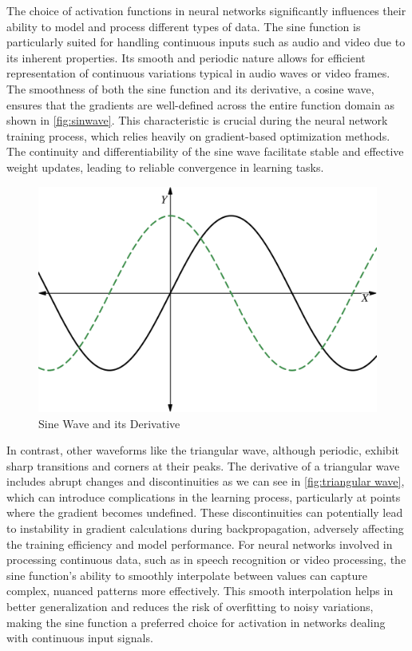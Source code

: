     The choice of activation functions in neural networks significantly influences their ability to model and process different types of data. The sine function is particularly suited for handling continuous inputs such as audio and video due to its inherent properties. Its smooth and periodic nature allows for efficient representation of continuous variations typical in audio waves or video frames. The smoothness of both the sine function and its derivative, a cosine wave, ensures that the gradients are well-defined across the entire function domain as shown in \autoref{fig:sinwave}. This characteristic is crucial during the neural network training process, which relies heavily on gradient-based optimization methods. The continuity and differentiability of the sine wave facilitate stable and effective weight updates, leading to reliable convergence in learning tasks.

    \begin{figure}[H]
        \centering
        \includegraphics[height=0.25\textheight]{assets/sine-wave.png}
        \caption{Sine Wave and its Derivative}
        \label{fig:sinwave}
    \end{figure}

    In contrast, other waveforms like the triangular wave, although periodic, exhibit sharp transitions and corners at their peaks. The derivative of a triangular wave includes abrupt changes and discontinuities as we can see in \autoref{fig:triangular wave}, which can introduce complications in the learning process, particularly at points where the gradient becomes undefined. These discontinuities can potentially lead to instability in gradient calculations during backpropagation, adversely affecting the training efficiency and model performance. For neural networks involved in processing continuous data, such as in speech recognition or video processing, the sine function's ability to smoothly interpolate between values can capture complex, nuanced patterns more effectively. This smooth interpolation helps in better generalization and reduces the risk of overfitting to noisy variations, making the sine function a preferred choice for activation in networks dealing with continuous input signals.
    
